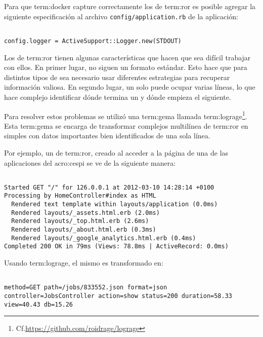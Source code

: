Para que \gls{term:docker} capture correctamente los  de
\gls{term:ror} es posible agregar la siguiente especificación al archivo
\texttt{config/application.rb} de la aplicación:

\begin{lstlisting}

config.logger = ActiveSupport::Logger.new(STDOUT)

\end{lstlisting}

Los  de \gls{term:ror} tienen algunas características que hacen que
sea difícil trabajar con ellos. En primer lugar, no siguen un formato estándar.
Esto hace que para distintos tipos de  sea necesario usar diferentes
estrategias para recuperar información valiosa. En segundo lugar, un solo
 puede ocupar varias líneas, lo que hace complejo identificar dónde
termina un  y dónde empieza el siguiente.

Para resolver estos problemas se utilizó una \gls{term:gema} llamada
\gls{term:lograge}\footnote{Cf.\url{https://github.com/roidrage/lograge}}.
Esta \gls{term:gema} se encarga de transformar complejos  multilínea
de \gls{term:ror} en simples  con datos importantes bien identificados
de una sola línea.

Por ejemplo, un  de \gls{term:ror}, creado al acceder a la página
 de una de las aplicaciones del \gls{acro:cespi} se ve de la siguiente
manera:

\begin{lstlisting}

Started GET "/" for 126.0.0.1 at 2012-03-10 14:28:14 +0100
Processing by HomeController#index as HTML
  Rendered text template within layouts/application (0.0ms)
  Rendered layouts/_assets.html.erb (2.0ms)
  Rendered layouts/_top.html.erb (2.6ms)
  Rendered layouts/_about.html.erb (0.3ms)
  Rendered layouts/_google_analytics.html.erb (0.4ms)
Completed 200 OK in 79ms (Views: 78.8ms | ActiveRecord: 0.0ms)

\end{lstlisting}

Usando \gls{term:lograge}, el mismo  es transformado en:

\begin{lstlisting}

method=GET path=/jobs/833552.json format=json controller=JobsController action=show status=200 duration=58.33 view=40.43 db=15.26

\end{lstlisting}

